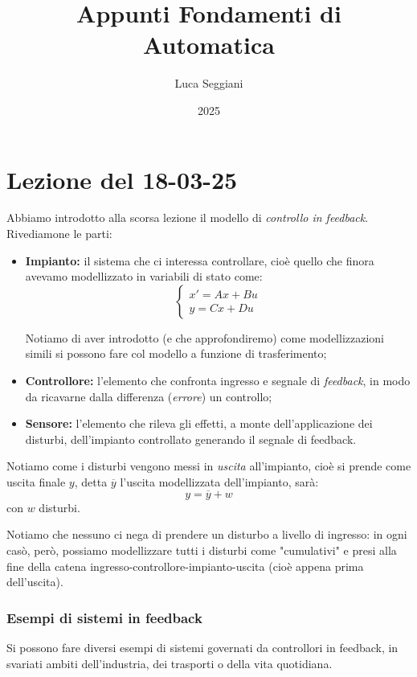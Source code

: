 \documentclass[a4paper,11pt]{article}
\title{Appunti Fondamenti di Automatica}
\author{Luca Seggiani}
\date{2025}
\begin{document}
\section{Lezione del 18-03-25}

\thispagestyle{empty}
\pagestyle{fancy}

Abbiamo introdotto alla scorsa lezione il modello di \textit{controllo in feedback}.
Rivediamone le parti:
\begin{itemize}
	\item \textbf{Impianto:} il sistema che ci interessa controllare, cioè quello che finora avevamo modellizzato in variabili di stato come:
		\[
			\begin{cases}		
				x' = Ax + Bu \\
				y = Cx + Du
			\end{cases}
		\]

		Notiamo di aver introdotto (e che approfondiremo) come modellizzazioni simili si possono fare col modello a funzione di trasferimento;
	\item \textbf{Controllore:} l'elemento che confronta ingresso e segnale di \textit{feedback}, in modo da ricavarne dalla differenza (\textit{errore}) un controllo;
	\item \textbf{Sensore:} l'elemento che rileva gli effetti, a monte dell'applicazione dei disturbi, dell'impianto controllato generando il segnale di feedback.
\end{itemize}

Notiamo come i disturbi vengono messi in \textit{uscita} all'impianto, cioè si prende come uscita finale $y$, detta $\overline{y}$ l'uscita modellizzata dell'impianto, sarà:
$$
y = \overline{y} + w
$$
con $w$ disturbi.

Notiamo che nessuno ci nega di prendere un disturbo a livello di ingresso: in ogni casò, però, possiamo modellizzare tutti i disturbi come "cumulativi" e presi alla fine della catena ingresso-controllore-impianto-uscita (cioè appena prima dell'uscita).

\subsubsection{Esempi di sistemi in feedback}
Si possono fare diversi esempi di sistemi governati da controllori in feedback, in svariati ambiti dell'industria, dei trasporti o della vita quotidiana.
\end{document}
